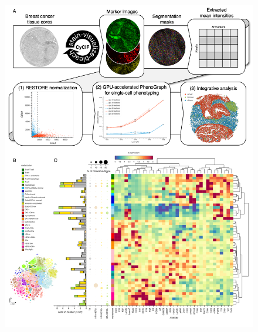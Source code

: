 \documentclass[preprint,review,3p,12pt]{elsarticle}
\begin{document}




% 





\begin{figure}[p]
\centering\includegraphics[width=\linewidth,
                 keepaspectratio]{fig1_condensed}
\caption{}
\label{fig:fig1}
\end{figure}
\end{document}
